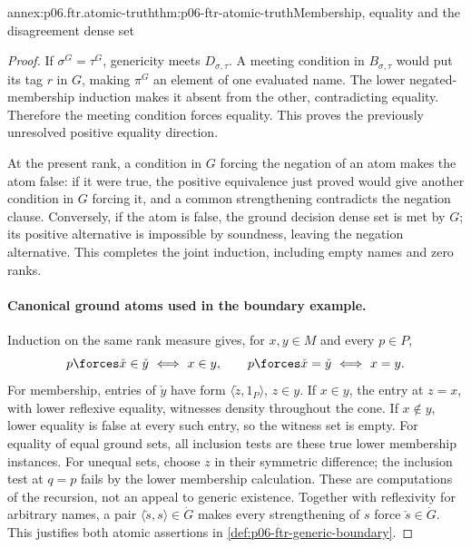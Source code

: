 \begin{annexitem}{annex:p06.ftr.atomic-truth}{thm:p06-ftr-atomic-truth}{Membership, equality and the disagreement dense set}
\begin{proof}
If \(\sigma^G=\tau^G\), genericity meets \(D_{\sigma,\tau}\).
A meeting condition in \(B_{\sigma,\tau}\) would put its tag \(r\)
in \(G\), making \(\pi^G\) an element of one evaluated name.
The lower negated-membership induction makes it absent from the other,
contradicting equality. Therefore the meeting condition forces equality.
This proves the previously unresolved positive equality direction.

At the present rank, a condition in \(G\) forcing the negation of an
atom makes the atom false: if it were true, the positive equivalence
just proved would give another condition in \(G\) forcing it, and a
common strengthening contradicts the negation clause. Conversely, if
the atom is false, the ground decision dense set is met by \(G\);
its positive alternative is impossible by soundness, leaving the
negation alternative. This completes the joint induction, including
empty names and zero ranks.

\paragraph{Canonical ground atoms used in the boundary example.}
Induction on the same rank measure gives, for \(x,y\in M\) and every
\(p\in P\),
\[
 p\forces\check x\in\check y\ \Longleftrightarrow\ x\in y,
 \qquad p\forces\check x=\check y\ \Longleftrightarrow\ x=y.
\]
For membership, entries of \(\check y\) have form
\(\langle\check z,1_P\rangle\), \(z\in y\). If \(x\in y\), the
entry at \(z=x\), with lower reflexive equality, witnesses density
throughout the cone. If \(x\notin y\), lower equality is false at
every such entry, so the witness set is empty. For equality of equal
ground sets, all inclusion tests are these true lower membership
instances. For unequal sets, choose \(z\) in their symmetric difference;
the inclusion test at \(q=p\) fails by the lower membership calculation.
These are computations of the recursion, not an appeal to generic
existence. Together with reflexivity for arbitrary names, a pair
\(\langle\check s,s\rangle\in\dot G\) makes every strengthening
of \(s\) force \(\check s\in\dot G\). This justifies both
atomic assertions in \cref{def:p06-ftr-generic-boundary}.
\end{proof}
\end{annexitem}

